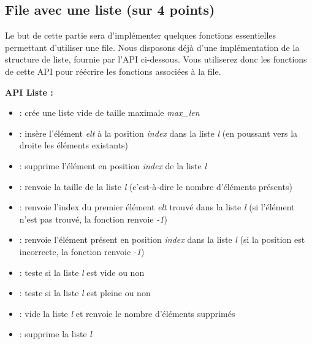 \documentclass[11pt,a4paper]{article}
\begin{document}
\begin{center}
\end{center}


\clearpage


\subsection{File avec une liste (sur 4 points)}

\noindent Le but de cette partie sera d'implémenter quelques fonctions essentielles permettant d'utiliser une file.
Nous disposons déjà d'une implémentation de la structure de liste, fournie par l'API ci-dessous.
Vous utiliserez donc les fonctions de cette API pour réécrire les fonctions associées à la file.

\medskip

\noindent \textbf{API Liste :}

\begin{itemize}
\item {} : crée une liste vide de taille maximale \textit{max\_len}
\item {} : insère l'élément \textit{elt} à la position \textit{index} dans la liste \textit{l} (en poussant vers la droite les éléments existants)
\item {} : supprime l'élément en position \textit{index} de la liste \textit{l}
\item {} : renvoie la taille de la liste \textit{l} (c'est-à-dire le nombre d'éléments présents)
\item {} : renvoie l'index du premier élément \textit{elt} trouvé dans la liste \textit{l} (si l'élément n'est pas trouvé, la fonction renvoie \textit{-1})
\item {} : renvoie l'élément présent en position \textit{index} dans la liste \textit{l} (si la position est incorrecte, la fonction renvoie \textit{-1})
\item {} : teste si la liste \textit{l} est vide ou non
\item {} : teste si la liste \textit{l} est pleine ou non
\item {} : vide la liste \textit{l} et renvoie le nombre d'éléments supprimés
\item {} : supprime la liste \textit{l}
\end{itemize}
\end{document}
